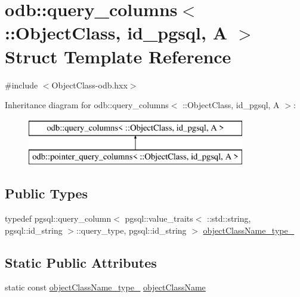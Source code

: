 \hypertarget{structodb_1_1query__columns_3_01_1_1_object_class_00_01id__pgsql_00_01_a_01_4}{}\section{odb\+:\+:query\+\_\+columns$<$ \+:\+:Object\+Class, id\+\_\+pgsql, A $>$ Struct Template Reference}
\label{structodb_1_1query__columns_3_01_1_1_object_class_00_01id__pgsql_00_01_a_01_4}


{\ttfamily \#include $<$Object\+Class-\/odb.\+hxx$>$}

Inheritance diagram for odb\+:\+:query\+\_\+columns$<$ \+:\+:Object\+Class, id\+\_\+pgsql, A $>$\+:\begin{figure}[H]
\begin{center}
\leavevmode
\includegraphics[height=2.000000cm]{df/da4/structodb_1_1query__columns_3_01_1_1_object_class_00_01id__pgsql_00_01_a_01_4}
\end{center}
\end{figure}
\subsection*{Public Types}
\begin{DoxyCompactItemize}
\item 
typedef pgsql\+::query\+\_\+column$<$ pgsql\+::value\+\_\+traits$<$ \+::std\+::string, pgsql\+::id\+\_\+string $>$\+::query\+\_\+type, pgsql\+::id\+\_\+string $>$ \hyperlink{structodb_1_1query__columns_3_01_1_1_object_class_00_01id__pgsql_00_01_a_01_4_a3e73103db9fee7bc5103f0a6f89e9821}{object\+Class\+Name\+\_\+type\+\_\+}
\end{DoxyCompactItemize}
\subsection*{Static Public Attributes}
\begin{DoxyCompactItemize}
\item 
static const \hyperlink{structodb_1_1query__columns_3_01_1_1_object_class_00_01id__pgsql_00_01_a_01_4_a3e73103db9fee7bc5103f0a6f89e9821}{object\+Class\+Name\+\_\+type\+\_\+} \hyperlink{structodb_1_1query__columns_3_01_1_1_object_class_00_01id__pgsql_00_01_a_01_4_a448f56b77cf6c487660b8870ec5fdab5}{object\+Class\+Name}
\end{DoxyCompactItemize}


